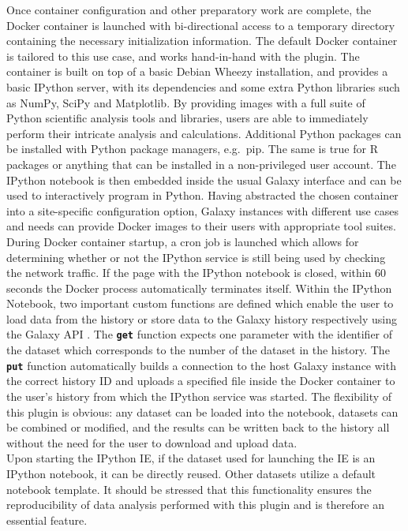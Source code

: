 \documentclass{bioinfo}
\begin{document}
\begin{methods}
Once container configuration and other preparatory work are complete, the Docker container is launched with bi-directional
access to a temporary directory containing the necessary initialization information. The default Docker container is
tailored to this use case, and works hand-in-hand with the plugin. The container is built on top of a basic Debian Wheezy installation,
and provides a basic IPython server, with its dependencies and some extra Python libraries such as NumPy, SciPy and Matplotlib.
By providing images with a full suite of Python scientific analysis tools and libraries, users are able 
to immediately perform their intricate analysis and calculations. Additional Python packages can be installed with Python
package managers, e.g.\ pip. The same is true for R packages or anything that can be installed in a non-privileged user account. 
The IPython notebook is then embedded inside the usual Galaxy interface and can be used to interactively program in Python.
Having abstracted the chosen container into a site-specific configuration option, Galaxy instances with different use cases
and needs can provide Docker images to their users with appropriate tool suites.\\
During Docker container startup, a cron job is launched which allows for determining whether or not the IPython service
is still being used by checking the network traffic. If the page with the IPython notebook is closed, within 60 seconds the
Docker process automatically terminates itself. Within the IPython Notebook, two important custom functions are defined which enable the
user to load data from the history or store data to the Galaxy history respectively using the Galaxy API \citep{Sloggett2013}.
The \textbf{\texttt{get}} function expects one parameter with the identifier of the dataset which corresponds to the number
of the dataset in the history. The \textbf{\texttt{put}} function automatically builds a connection to the host
Galaxy instance with the correct history ID and uploads a specified file inside the Docker container to the user's
history from which the IPython service was started. The flexibility of this plugin is obvious: any dataset can be
loaded into the notebook, datasets can be combined or modified, and the results can be written back to the history
all without the need for the user to download and upload data. \\
Upon starting the IPython IE, if the dataset used for launching the IE is an IPython
notebook, it can be directly reused. Other datasets utilize a default notebook template. It should be stressed that
this functionality ensures the reproducibility of data analysis performed with this plugin and is therefore an essential
feature.



\end{methods}
\end{document}
